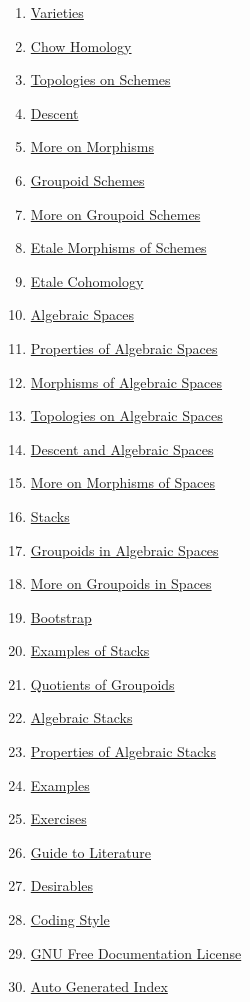\begin{multicols}{2}
\begin{enumerate}
\item \hyperref[varieties-section-phantom]{Varieties}
\item \hyperref[chow-section-phantom]{Chow Homology}
\item \hyperref[topologies-section-phantom]{Topologies on Schemes}
\item \hyperref[descent-section-phantom]{Descent}
\item \hyperref[more-morphisms-section-phantom]{More on Morphisms}
\item \hyperref[groupoids-section-phantom]{Groupoid Schemes}
\item \hyperref[more-groupoids-section-phantom]{More on Groupoid Schemes}
\item \hyperref[etale-section-phantom]{Etale Morphisms of Schemes}
\item \hyperref[etale-cohomology-section-phantom]{Etale Cohomology}
\item \hyperref[spaces-section-phantom]{Algebraic Spaces}
\item \hyperref[spaces-properties-section-phantom]{Properties of Algebraic Spaces}
\item \hyperref[spaces-morphisms-section-phantom]{Morphisms of Algebraic Spaces}
\item \hyperref[spaces-topologies-section-phantom]{Topologies on Algebraic Spaces}
\item \hyperref[spaces-descent-section-phantom]{Descent and Algebraic Spaces}
\item \hyperref[spaces-more-morphisms-section-phantom]{More on Morphisms of Spaces}
\item \hyperref[stacks-section-phantom]{Stacks}
\item \hyperref[spaces-groupoids-section-phantom]{Groupoids in Algebraic Spaces}
\item \hyperref[spaces-more-groupoids-section-phantom]{More on Groupoids in Spaces}
\item \hyperref[bootstrap-section-phantom]{Bootstrap}
\item \hyperref[examples-stacks-section-phantom]{Examples of Stacks}
\item \hyperref[groupoids-quotients-section-phantom]{Quotients of Groupoids}
\item \hyperref[algebraic-section-phantom]{Algebraic Stacks}
\item \hyperref[stacks-properties-section-phantom]{Properties of Algebraic Stacks}
\item \hyperref[examples-section-phantom]{Examples}
\item \hyperref[exercises-section-phantom]{Exercises}
\item \hyperref[guide-section-phantom]{Guide to Literature}
\item \hyperref[desirables-section-phantom]{Desirables}
\item \hyperref[coding-section-phantom]{Coding Style}
\item \hyperref[fdl-section-phantom]{GNU Free Documentation License}
\item \hyperref[index-section-phantom]{Auto Generated Index}
\end{enumerate}
\end{multicols}
